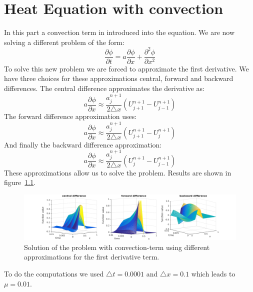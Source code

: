 \documentclass[ twoside,openright,titlepage,numbers=noenddot,headinclude,%
                footinclude=true,cleardoublepage=empty,abstractoff, %
                BCOR=5mm,paper=a4,fontsize=11pt,%
                ngerman,american,%
                ]{scrreprt}
\begin{document}
\chapter{Heat Equation with convection}
In this part a convection term in introduced into the equation. We are now solving a different problem of the form:
\begin{equation}
\frac{\partial \phi}{\partial t} = a\frac{\partial \phi}{\partial x} + \frac{\partial^2 \phi}{\partial x^2}
\end{equation}
To solve this new problem we are forced to approximate the first derivative. We have three choices for these approximations central, forward and backward differences. The central difference approximates the derivative as:
\begin{equation}
a\frac{\partial \phi}{\partial x} \approx \frac{a_j^{n+1}}{2\triangle x}(U_{j+1}^{n+1} - U_{j-1}^{n+1})
\end{equation}
The forward difference approximation uses:
\begin{equation}
a\frac{\partial \phi}{\partial x} \approx \frac{a_j^{n+1}}{2\triangle x}(U_{j+1}^{n+1} - U_{j}^{n+1})
\end{equation}
And finally the backward difference approximation:
\begin{equation}
a\frac{\partial \phi}{\partial x} \approx \frac{a_j^{n+1}}{2\triangle x}(U_{j}^{n+1} - U_{j-1}^{n+1})
\end{equation} 
These approximations allow us to solve the problem. Results are shown in figure~\ref{fig:approx}.
\begin{figure}
\includegraphics[scale = 0.4]{images/convection.png}
\caption{Solution of the problem with convection-term using different approximations for the first derivative term.}
\label{fig:approx}
\end{figure}
To do the computations we used $\triangle t = 0.0001$ and $\triangle x = 0.1$ which leads to $\mu = 0.01$.
\end{document}
